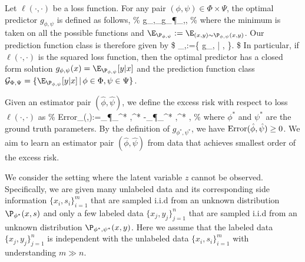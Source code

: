 
Let $\ell(\cdot,\cdot)$ be a loss function. For any pair $(\phi,\psi)\in\Phi\times\Psi$, the optimal predictor $g_{\phi,\psi}$ is defined as follows,
\%\label{opt_est}
g_{\phi,\psi}\leftarrow\argmin_{g}\E_{\P_{\phi,\psi}},
\%
where the minimum is taken on all the possible functions and $\E_{\P_{\phi,\psi}}:=\E_{(x,y)\sim\P_{\phi,\psi}(x,y)}$. Our prediction function class is therefore given by
\$
_{\Phi,\Psi}:=\big\{ g_{\phi,\psi} \big| \phi \in \Phi, \psi \in \Psi \big\}.
\$
In particular, if $\ell(\cdot,\cdot)$ is the squared loss function, then the optimal predictor has a closed form solution $g_{\phi,\psi}(x)=\E_{\P_{\phi,\psi}}[y|x]$ and the prediction function class $\mathcal{G}_{\Phi,\Psi}=\{\E_{\P_{\phi,\psi}}[y|x]\,|\, \phi \in \Phi, \psi \in \Psi \}$.

Given an estimator pair  $(\hat\phi,\hat\psi)$, we define the excess risk with respect to loss $\ell(\cdot,\cdot)$ as
\%\label{error}
{\rm Error}_{\ell}(\hat\phi,\hat\psi):=\E_{\P_{\phi^* ,\psi^* }}-\E_{\P_{\phi^* ,\psi^* }},
\%
where $\phi^* $ and $\psi^* $ are the ground truth parameters. By the definition of $g_{\phi^* ,\psi^* }$, we have ${\rm Error}(\hat\phi,\hat\psi)\geq0$. We aim to learn an estimator pair $(\hat\phi,\hat\psi)$ from data that achieves smallest order of the excess risk.





We consider the setting where the latent variable $z$ cannot be observed. Specifically, we are given many unlabeled data and its corresponding side information $\{x_i,s_i\}^m_{i=1}$ that are sampled i.i.d from an unknown distribution $\P_{\phi^* }(x,s)$ and only a few labeled data $\{x_j,y_j\}^n_{j=1}$ that are sampled i.i.d from an unknown distribution $\P_{\phi^* ,\psi^* }(x,y)$. Here we assume that the labeled data $\{x_j,y_j\}^n_{j=1}$ is independent with the unlabeled data $\{x_i,s_i\}^m_{i=1}$ with understanding $m\gg n$. 


